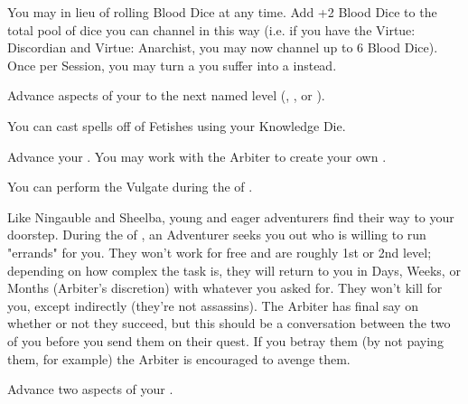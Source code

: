 \begin{multicols*}{2}

You may  in lieu of rolling Blood Dice at any time. Add +2 Blood Dice to the total pool of dice you can channel in this way (i.e. if you have the Virtue: Discordian and Virtue: Anarchist, you may now channel up to 6 Blood Dice). Once per Session, you may turn a  you suffer into a  instead.

\cbreak


Advance  aspects of your  to the next named level (\DEATH, \INJURY, or \INSANITY).


You can cast spells off of Fetishes using your Knowledge Die.


Advance your  \DCUP. You may work with the Arbiter to create your own .



You can perform the  Vulgate during the  of . 


Like Ningauble and Sheelba, young and eager adventurers find their way to your doorstep. During the  of , an Adventurer seeks you out who is willing to run "errands" for you. They won't work for free and are roughly 1st or 2nd level; depending on how complex the task is, they will return to you in Days, Weeks, or Months (Arbiter's discretion) with whatever you asked for. They won't kill for you, except indirectly (they're not assassins). The Arbiter has final say on whether or not they succeed, but this should be a conversation between the two of you before you send them on their quest. If you betray them (by not paying them, for example) the Arbiter is encouraged to avenge them.


Advance two  aspects of your  \DCUP.


\end{multicols*}
